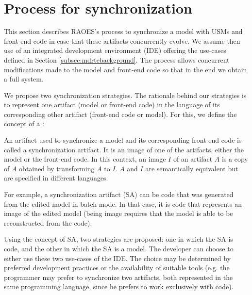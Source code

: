 \section{Process for synchronization}
\label{sec:collaboration}
This section describes RAOES's process to synchronize a model with USMs and front-end code in case that these artifacts concurrently evolve.
We assume then use of an integrated development environment (IDE) %
offering the use-cases defined in Section \ref{subsec:mdrtebackground}. 
The process allows concurrent modifications made to the model
and front-end code so that in the end we obtain a full system.


We propose two synchronization strategies.
The rationale behind our strategies
is to represent one artifact (model or front-end code) in the language of its corresponding other artifact (front-end code or model).
For this, we define the
concept of a :

\begin{definition}
	An artifact used to synchronize a model and its corresponding front-end code
	is called a synchronization artifact.
	It is an image of one of the artifacts, either the model or the front-end code.
	In this context, an image $I$ of an artifact $A$ is a copy of $A$ obtained by
	transforming $A$ to $I$. $A$ and $I$ are semantically equivalent but are specified in different languages.
\end{definition}

For example, a synchronization artifact (SA) can be code that was generated from the edited model in batch mode.
In that case, it is code that represents an image of the edited model (being image requires that the model is able to be reconstructed from the code).

Using the concept of SA, two strategies are
proposed: one in which the SA is code,
and the other in which the SA is a model.
The developer can choose to either use these two use-cases of the IDE. 
The choice may be determined by
preferred development practices or the availability of suitable tools (e.g. the programmer
may prefer to synchronize two artifacts, both represented
in the same programming language, since he prefers to
work exclusively with code).

